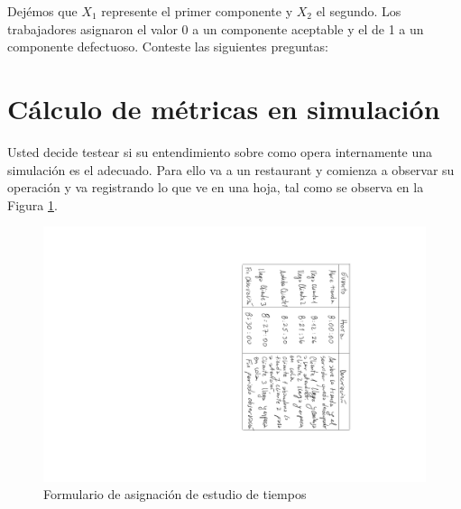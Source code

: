 \documentclass[11pt]{exam}
\begin{document}
\begin{questions}
Dej\'emos que $X_1$ represente el primer componente y $X_2$ el segundo. Los trabajadores asignaron el valor 0 a un componente aceptable y el de 1 a un componente defectuoso. Conteste las siguientes preguntas:


\section*{C\'alculo de m\'etricas en simulaci\'on}
\question Usted decide testear si su entendimiento sobre como opera internamente una simulaci\'on es el adecuado. Para ello va a un restaurant y comienza a observar su operaci\'on y va registrando lo que ve en una hoja, tal como se observa en la Figura \ref{fig:esttiemp}.
\begin{figure}[htbp]
\centering
		\includegraphics[scale=0.7,keepaspectratio,trim={22cm 4cm 8.5cm 4cm},clip,angle =90]{dic1.png}
			\caption{Formulario de asignaci\'on de estudio de tiempos}
			\label{fig:esttiemp}
\end{figure}


\end{questions}
\end{document}
